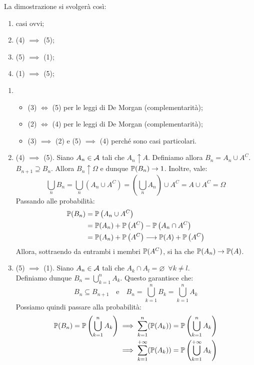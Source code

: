 \begin{dimo}
  La dimostrazione si svolgerà così:
  \begin{enumerate}[label=(\alph*)]
    \item casi ovvi;
    \item (4) $\implies$ (5);
    \item (5) $\implies$ (1);
    \item (1) $\implies$ (5);
  \end{enumerate}
  \bigskip
  \begin{enumerate}[label=(\alph*)]
    \item
      \begin{itemize}
        \item (3) $\iff$ (5) per le leggi di De Morgan (complementarità);
        \item (2) $\iff$ (4) per le leggi di De Morgan (complementarità);
        \item (3) $\implies$ (2) e (5) $\implies$ (4) perché sono casi particolari.
      \end{itemize}
    \item (4) $\implies$ (5).
      Siano $A_n \in \mathcal A$ tali che $A_n \uparrow A$. Definiamo allora $B_n = A_n \cup A^C$. \\
      $B_{n+1} \supseteq B_n$. Allora $B_n \uparrow \Omega$ e dunque $\mathbb P(B_n) \to 1$. Inoltre, vale:
      $$\bigcup\limits_{n} B_n = \bigcup\limits_{n} (A_n \cup A^C) = \left(\bigcup\limits_{n} A_n\right) \cup A^C = A \cup A^C = \Omega$$
      Passando alle probabilità:
      \begin{align*}
        \mathbb P(B_n) &= \mathbb P\left(A_n \cup A^C \right) \\
        &= \mathbb P(A_n) + \mathbb P \left(A^C\right) - \mathbb P\left(A_n \cap A^C\right)\\
        &=  \mathbb P(A_n) + \mathbb P \left(A^C\right) \longrightarrow \mathbb P(A) + \mathbb P\left(A^C\right)
      \end{align*}
      Allora, sottraendo da entrambi i membri $\mathbb P(A^C)$, si ha che $\mathbb P(A_n) \to \mathbb P(A)$.
    \item (5) $\implies$ (1).
      Siano $A_n \in \mathcal A$ tali che $ A_k \cap A_l = \varnothing \enspace \forall k \neq l.$ \\
      Definiamo dunque $B_n = \bigcup\limits_{k=1}^{n} A_k$.
      Questo garantisce che:
      $$B_n \subseteq B_{n+1} \quad \text{e} \quad B_n = \bigcup\limits_{k=1}^{n} B_k = \bigcup\limits_{k=1}^{n} A_k$$
      Possiamo quindi passare alla probabilità:
      \begin{align*}
        \mathbb P(B_n) = \mathbb P \left(\bigcup\limits_{k=1}^{n} A_k\right)
        &\implies \sum\limits_{k=1}^{n} (\mathbb P(A_k)) = \mathbb P\left(\bigcup\limits_{k=1}^{n} A_k\right)\\
        &\implies \sum\limits_{k=1}^{+\infty} (\mathbb P(A_k)) = \mathbb P \left( \bigcup\limits_{k=1}^{+\infty} A_k \right)
      \end{align*}


\end{enumerate}
\end{dimo}
